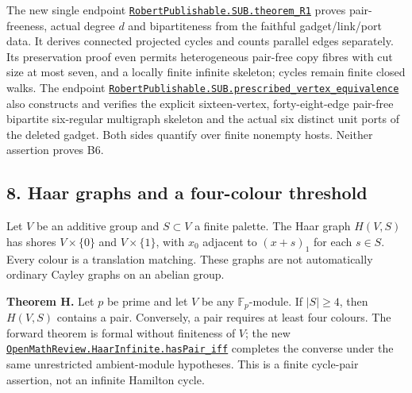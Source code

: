\documentclass[
  11pt,
]{article}
\newcounter{none} %
\begin{document}
The new single endpoint
\href{https://github.com/alejandrozu/openmath-2026-judging/blob/70c5ec3107658182f22c207d4c50f53f9cb3e602/robert-review-2026-10-07/lean/R1.lean\#L13}{\texttt{RobertPublishable.SUB.theorem\_R1}}
proves pair-freeness, actual degree \(d\) and bipartiteness from the
faithful gadget/link/port data. It derives connected projected cycles
and counts parallel edges separately. Its preservation proof even
permits heterogeneous pair-free copy fibres with cut size at most seven,
and a locally finite infinite skeleton; cycles remain finite closed
walks. The endpoint
\href{https://github.com/alejandrozu/openmath-2026-judging/blob/70c5ec3107658182f22c207d4c50f53f9cb3e602/robert-review-2026-10-07/lean/PrescribedVertex.lean\#L89}{\texttt{RobertPublishable.SUB.prescribed\_vertex\_equivalence}}
also constructs and verifies the explicit sixteen-vertex,
forty-eight-edge pair-free bipartite six-regular multigraph skeleton and
the actual six distinct unit ports of the deleted gadget. Both sides
quantify over finite nonempty hosts. Neither assertion proves B6.

\subsection{8. Haar graphs and a four-colour
threshold}\label{haar-graphs-and-a-four-colour-threshold}

Let \(V\) be an additive group and \(S\subset V\) a finite palette. The
Haar graph \(H(V,S)\) has shores \(V\times\{0\}\) and \(V\times\{1\}\),
with \(x_0\) adjacent to \((x+s)_1\) for each \(s\in S\). Every colour
is a translation matching. These graphs are not automatically ordinary
Cayley graphs on an abelian group.

\textbf{Theorem H.} Let \(p\) be prime and let \(V\) be any
\(\mathbb F_p\)-module. If \(|S|\geq4\), then \(H(V,S)\) contains a
pair. Conversely, a pair requires at least four colours. The forward
theorem is formal without finiteness of \(V\); the new
\href{https://github.com/alejandrozu/openmath-2026-judging/blob/70c5ec3107658182f22c207d4c50f53f9cb3e602/robert-review-2026-10-07/lean/HaarInfinite.lean\#L110}{\texttt{OpenMathReview.HaarInfinite.hasPair\_iff}}
completes the converse under the same unrestricted ambient-module
hypotheses. This is a finite cycle-pair assertion, not an infinite
Hamilton cycle.
\end{document}
